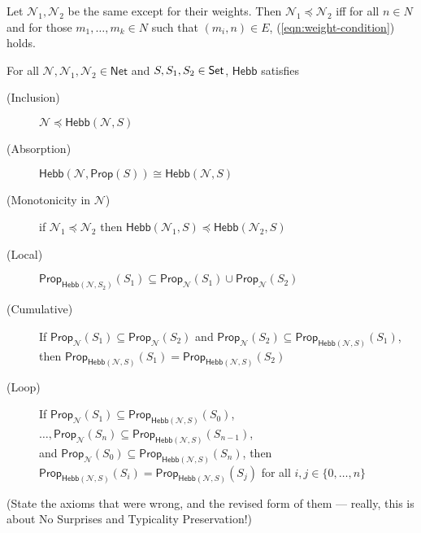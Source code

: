 \documentclass[letterpaper]{article}
\theoremstyle{definition}
\newenvironment{restatetheorem}[1]
  {\renewcommand\theinnercustomthm{#1}\innercustomthm}
  {\endinnercustomthm}
\newenvironment{restatecorollary}[1]
  {\renewcommand\theinnercustomcorollary{#1}\innercustomcorollary}
  {\endinnercustomcorollary}
\newcommand{\Set}{\mbox{\sf Set}}
\newcommand{\set}[1]{\{ #1 \}}
\newcommand{\Prop}{\textsf{Prop}}
\newcommand{\Inc}{\textsf{Hebb}}
\newcommand{\AllNets}{\mathsf{Net}}
\newcommand{\Net}{\mathcal{N}}
\begin{document}
\begin{restatecorollary}{1}
    Let $\Net_1, \Net_2$ be the same except for their weights.  Then $\Net_1 \preceq \Net_2$ iff for all $n \in N$ and for those $m_1, \ldots, m_k \in N$ such that $(m_i, n) \in E$, (\ref{eqn:weight-condition}) holds.
\end{restatecorollary}

\begin{restatetheorem}{3}
    For all $\Net, \Net_1, \Net_2 \in \AllNets$ and $S, S_1, S_2 \in \Set$, $\Inc$ satisfies
    \begin{description}
        \item[(Inclusion)]
        $\Net \preceq \Inc(\Net, S)$
        
        \item[(Absorption)]
        $\Inc(\Net, \Prop(S)) \cong \Inc(\Net, S)$
        
        \item[(Monotonicity in $\Net$)] if ${\Net_1 \preceq \Net_2}$
        then ${\Inc(\Net_1, S) \preceq \Inc(\Net_2, S)}$
        
        \item[(Local)]
        $\Prop_{\Inc(\Net, S_2)}(S_1) \subseteq \Prop_\Net(S_1) \cup \Prop_\Net(S_2)$
        
        \item[(Cumulative)] If ${\Prop_\Net(S_1) \subseteq \Prop_\Net(S_2)}$ and ${\Prop_\Net(S_2) \subseteq \Prop_{\Inc(\Net, S)}(S_1)}$,\\
        then $\Prop_{\Inc(\Net, S)}(S_1) = \Prop_{\Inc(\Net, S)}(S_2)$
        
        \item[(Loop)] If ${\Prop_\Net(S_1) \subseteq \Prop_{\Inc(\Net, S)}(S_0)}$,
        $\ldots, {\Prop_\Net(S_n) \subseteq \Prop_{\Inc(\Net, S)}(S_{n-1})}$,\\
        and 
        ${\Prop_\Net(S_0) \subseteq \Prop_{\Inc(\Net, S)}(S_n)}$,
        then ${\Prop_{\Inc(\Net, S)}(S_i) = \Prop_{\Inc(\Net, S)}(S_j)}$
        for all $i, j \in \set{0, \ldots, n}$
    \end{description}
\end{restatetheorem}

(State the axioms that were wrong, and the revised form of them --- really, this is about No Surprises and Typicality Preservation!)



\end{document}
